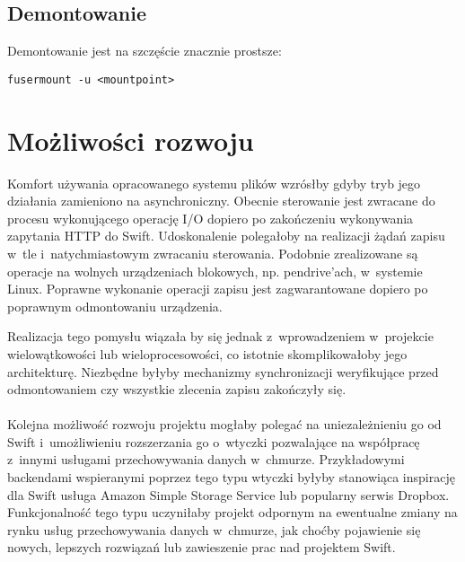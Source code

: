 \subsection{Demontowanie}

Demontowanie jest na szczęście znacznie prostsze:

\begin{verbatim}
fusermount -u <mountpoint>
\end{verbatim}

\section{Możliwości rozwoju}

Komfort używania opracowanego systemu plików wzrósłby gdyby tryb jego działania
zamieniono na asynchroniczny. Obecnie sterowanie jest zwracane do procesu
wykonującego operację I/O dopiero po zakończeniu wykonywania zapytania HTTP do
Swift. Udoskonalenie polegałoby na realizacji żądań zapisu w~tle
i~natychmiastowym zwracaniu sterowania. Podobnie zrealizowane są operacje na
wolnych urządzeniach blokowych, np. pendrive'ach, w~systemie Linux. Poprawne
wykonanie operacji zapisu jest zagwarantowane dopiero po poprawnym odmontowaniu
urządzenia.

Realizacja tego pomysłu wiązała by się jednak z~wprowadzeniem w~projekcie
wielowątkowości lub wieloprocesowości, co istotnie skomplikowałoby jego
architekturę. Niezbędne byłyby mechanizmy synchronizacji weryfikujące przed
odmontowaniem czy wszystkie zlecenia zapisu zakończyły się.

\paragraph{}

Kolejna możliwość rozwoju projektu mogłaby polegać na uniezależnieniu go od
Swift i~umożliwieniu rozszerzania go o~wtyczki pozwalające na współpracę
z~innymi usługami przechowywania danych w~chmurze. Przykładowymi backendami
wspieranymi poprzez tego typu wtyczki byłyby stanowiąca inspirację dla Swift
usługa Amazon Simple Storage Service lub popularny serwis Dropbox.
Funkcjonalność tego typu uczyniłaby projekt odpornym na ewentualne zmiany na
rynku usług przechowywania danych w~chmurze, jak choćby pojawienie się nowych,
lepszych rozwiązań lub zawieszenie prac nad projektem Swift.





